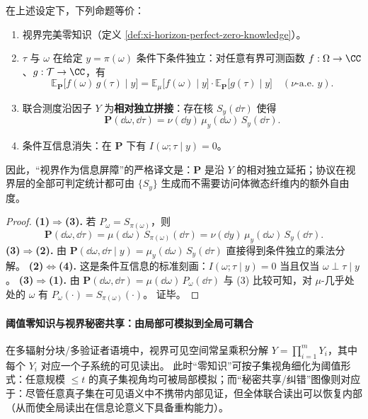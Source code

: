\begin{theorem}\label{thm:xi-horizon-perfect-zk-equivalences}
在上述设定下，下列命题等价：
\begin{enumerate}
  \item 视界完美零知识（定义 \ref{def:xi-horizon-perfect-zero-knowledge}）。
  \item \(\tau\) 与 \(\omega\) 在给定 \(y=\pi(\omega)\) 条件下条件独立：对任意有界可测函数 \(f:\Omega\to\CC\)、\(g:\mathcal{T}\to\CC\)，有
  \[
  \mathbb{E}_{\mathbf{P}}\bigl[f(\omega)\,g(\tau)\mid y\bigr]
  =
  \mathbb{E}_{\mu}\bigl[f(\omega)\mid y\bigr]\cdot
  \mathbb{E}_{\mathbf{P}}\bigl[g(\tau)\mid y\bigr]
  \quad(\nu\text{-a.e. }y).
  \]
  \item 联合测度沿因子 \(Y\) 为\textbf{相对独立拼接}：存在核 \(S_y(\dd\tau)\) 使得
  \[
  \mathbf{P}(\dd\omega,\dd\tau)
  =
  \nu(\dd y)\,\mu_y(\dd\omega)\,S_y(\dd\tau).
  \]
  \item 条件互信息消失：在 \(\mathbf{P}\) 下有 \(I(\omega;\tau\mid y)=0\)。
\end{enumerate}
因此，“视界作为信息屏障”的严格译文是：\(\mathbf{P}\) 是沿 \(Y\) 的相对独立延拓；协议在视界层的全部可判定统计都可由 \(\{S_y\}\) 生成而不需要访问体微态纤维内的额外自由度。
\end{theorem}

\begin{proof}
\textbf{(1)\(\Rightarrow\)(3).}
若 \(P_{\omega}=S_{\pi(\omega)}\)，则
\[
\mathbf{P}(\dd\omega,\dd\tau)
=
\mu(\dd\omega)\,S_{\pi(\omega)}(\dd\tau)
=
\nu(\dd y)\,\mu_y(\dd\omega)\,S_y(\dd\tau).
\]
\textbf{(3)\(\Rightarrow\)(2).}
由 \(\mathbf{P}(\dd\omega,\dd\tau\mid y)=\mu_y(\dd\omega)\,S_y(\dd\tau)\) 直接得到条件独立的乘法分解。
\textbf{(2)\(\Leftrightarrow\)(4).}
这是条件互信息的标准刻画：\(I(\omega;\tau\mid y)=0\) 当且仅当 \(\omega\perp \tau\mid y\)。
\textbf{(3)\(\Rightarrow\)(1).}
由 \(\mathbf{P}(\dd\omega,\dd\tau)=\mu(\dd\omega)\,P_{\omega}(\dd\tau)\) 与 (3) 比较可知，对 \(\mu\)-几乎处处的 \(\omega\) 有 \(P_{\omega}(\cdot)=S_{\pi(\omega)}(\cdot)\)。
证毕。
\end{proof}



\paragraph{阈值零知识与视界秘密共享：由局部可模拟到全局可耦合}
在多辐射分块/多验证者语境中，视界可见空间常呈乘积分解 \(Y=\prod_{i=1}^{m}Y_i\)，其中每个 \(Y_i\) 对应一个子系统的可见读出。
此时“零知识”可按子集视角细化为阈值形式：任意规模 \(\le t\) 的真子集视角均可被局部模拟；而“秘密共享/纠错”图像则对应于：尽管任意真子集在可见语义中不携带内部见证，但全体联合读出可以恢复内部（从而使全局读出在信息论意义下具备重构能力）。

